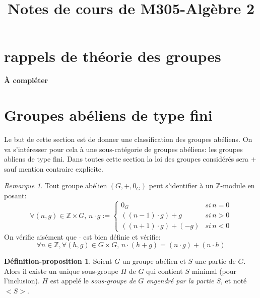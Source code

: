 \documentclass{article}
\newcommand{\Z}{\mathbb{Z}}
\theoremstyle{definition}
\newtheorem{depro}{Définition-proposition}
\theoremstyle{remark}
\newtheorem{rem}{Remarque}
\begin{document}
\title{Notes de cours de M305-Alg\`ebre 2}

\maketitle

\newpage

\tableofcontents

\newpage


\section{rappels de th\'eorie des groupes}

{\bf\`A compl\'eter}

\section{Groupes abéliens de type fini}

Le but de cette section est de donner une classification des groupes ab\'eliens. On va s'int\'eresser pour cela \`a une sous-cat\'egorie de groupes ab\'eliens: les groupes abliens de type fini. Dans toutes cette section la loi des groupes consid\'er\'es sera $+$ sauf mention contraire explicite.



\begin{rem}
Tout groupe ab\'elien $(G,+,0_G)$ peut s'identifier \`a un $\Z$-module en posant:
$$\forall (n,g)\in\Z\times G,\, n\cdot g:=\begin{cases}0_G & si\, n=0\\ ((n-1)\cdot g)+g & si\, n>0\\((n+1)\cdot g) + (-g) & si\, n<0\end{cases}$$
On v\'erifie ais\'ement que $\cdot$ est bien d\'efinie et v\'erifie:\\
$$\forall n\in \Z,\forall (h,g)\in G\times G,\, n\cdot(h+g)=(n\cdot g)+(n\cdot h)$$
\end{rem}

\begin{depro}
Soient $G$ un groupe abélien et $S$ une partie de $G$. Alors il existe un unique sous-groupe $H$ de $G$ qui contient $S$ minimal (pour l'inclusion). $H$ est appelé le \textit{sous-groupe de $G$ engendré par la partie $S$}, et noté $<S>$.
\end{depro}
\end{document}
